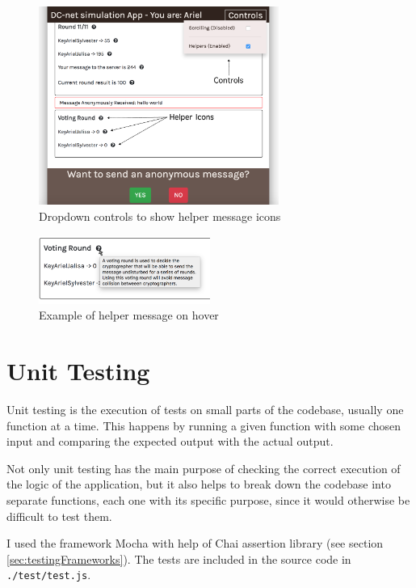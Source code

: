 \begin{figure}[H]
    \centering
    \includegraphics[width=0.70\textwidth]{Images/Implementation/controlsDropdown.png}
    \caption{Dropdown controls to show helper message icons}
    \label{fig:controlsDropdown}
\end{figure}

\begin{figure}[H]
    \centering
    \includegraphics[width=0.50\textwidth]{Images/Implementation/helperMessageExample.png}
    \caption{Example of helper message on hover}
    \label{fig:helperMessageExample}
\end{figure}




\section{Unit Testing}
Unit testing is the execution of tests on small parts of the codebase, usually one function at a time. This happens by running a given function with some chosen input and comparing the expected output with the actual output. 

Not only unit testing has the main purpose of checking the correct execution of the logic of the application, but it also helps to break down the codebase into separate functions, each one with its specific purpose, since it would otherwise be difficult to test them.

I used the framework Mocha with help of Chai assertion library (see section \ref{sec:testingFrameworks}). The tests are included in the source code in \lstinline{./test/test.js}.

